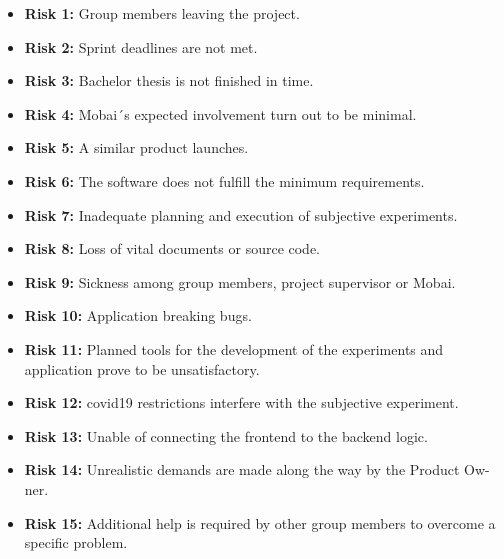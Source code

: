 \begin{itemize}
    \item \textbf{Risk 1:} Group members leaving the project.
    \item \textbf{Risk 2:} Sprint deadlines are not met.
    \item \textbf{Risk 3:} Bachelor thesis is not finished in time.
    \item \textbf{Risk 4:} Mobai´s expected involvement turn out to be minimal. 
    \item \textbf{Risk 5:} A similar product launches.
    \item \textbf{Risk 6:} The software does not fulfill the minimum requirements.
    \item \textbf{Risk 7:} Inadequate planning and execution of subjective experiments.
    \item \textbf{Risk 8:} Loss of vital documents or source code.
    \item \textbf{Risk 9:} Sickness among group members, project supervisor or Mobai.
    \item \textbf{Risk 10:} Application breaking bugs.
    \item \textbf{Risk 11:} Planned tools for the development of the experiments and application prove to be unsatisfactory. 
    \item \textbf{Risk 12:} \acrshort{covid19} restrictions interfere with the subjective experiment. 
    \item \textbf{Risk 13:} Unable of connecting the frontend to the backend logic. 
    \item \textbf{Risk 14:} Unrealistic demands are made along the way by the Product Ow-ner. 
    \item \textbf{Risk 15:} Additional help is required by other group members to overcome a specific problem.
\end{itemize}


